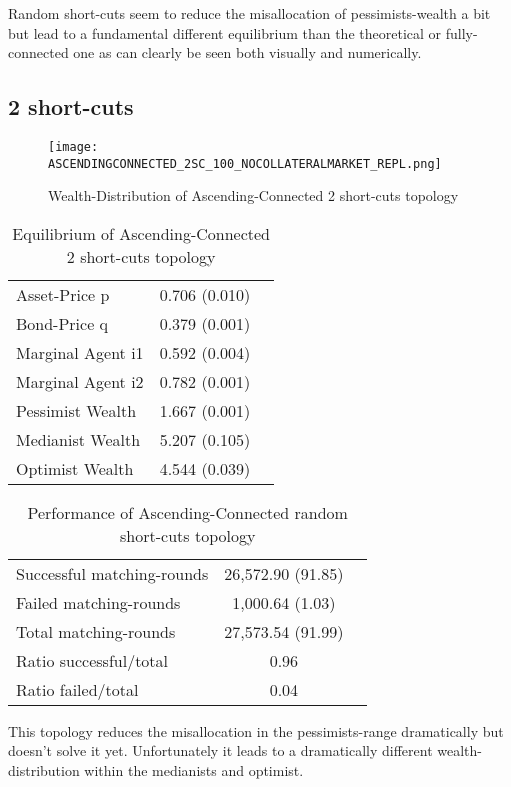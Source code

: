 \documentclass[Bachelorarbeit.tex]{subfiles}
\begin{document}
Random short-cuts seem to reduce the misallocation of pessimists-wealth a bit but lead to a fundamental different equilibrium than the theoretical or fully-connected one as can clearly be seen both visually and numerically.

\subsection{2 short-cuts}
\begin{figure}[H]
	\centering
  \texttt{[image: ASCENDINGCONNECTED\_2SC\_100\_NOCOLLATERALMARKET\_REPL.png]}
	\caption{Wealth-Distribution of Ascending-Connected 2 short-cuts topology}
	\label{fig:wealth_ASCENDINGCONNECTED_2SC_100_NOCOLLATERALMARKET_REPL}
\end{figure}

\begin{table}[H]
	\caption{Equilibrium of Ascending-Connected 2 short-cuts topology}
	\centering
	\begin{tabular} { l c r }
		\hline
		Asset-Price p & 0.706 (0.010) \\
		Bond-Price q & 0.379 (0.001) \\
		Marginal Agent i1 & 0.592 (0.004) \\
		Marginal Agent i2 & 0.782 (0.001) \\
		\hline
		Pessimist Wealth & 1.667 (0.001) \\
		Medianist Wealth & 5.207 (0.105) \\
		Optimist Wealth & 4.544 (0.039) \\
		\hline
	\end{tabular}
\end{table} 

\begin{table}[H]
	\caption{Performance of Ascending-Connected random short-cuts topology}
	\centering
	\begin{tabular} { l c r }
		\hline
		Successful matching-rounds & 26,572.90 (91.85) \\
		Failed matching-rounds & 1,000.64 (1.03) \\
		Total matching-rounds & 27,573.54 (91.99) \\
		\hline
		Ratio successful/total & 0.96 \\
		Ratio failed/total & 0.04 \\
		\hline
	\end{tabular}
\end{table}

This topology reduces the misallocation in the pessimists-range dramatically but doesn't solve it yet. Unfortunately it leads to a dramatically different wealth-distribution within the medianists and optimist.
\end{document}
